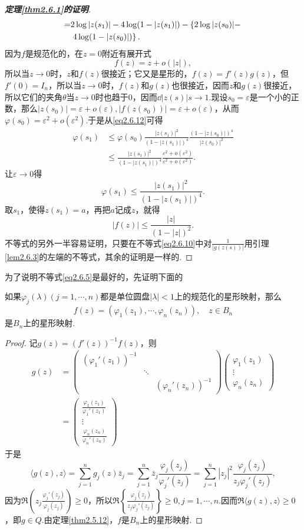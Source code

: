 \begin{proof}[\textbf{定理\ref{thm2.6.1}的证明}]
\begin{align}
	=&2\log|z(s_1)|-4\log(1-|z(s_1)|)-\left\{2\log|z(s_0)|-\right.\notag\\
	&\left.4\log(1-|z(s_0)|)\right\}.
\end{align}
因为$f$是规范化的，在$z=0$附近有展开式
\[f(z)=z+o(|z|),\]
所以当$z\to0$时，$z$和$f(z)$很接近；它又是星形的，$f(z)=f'(z)g(z)$，但$f'(0)=I_n$，所以当$z\to0$时，$f(z)$和$g(z)$也很接近，因而$z$和$g(z)$很接近，所以它们的夹角$\theta$当$z\to0$时也趋于$0$，因而$\dd{|z(s)|}{s}\to1$.现设$s_0=\varepsilon$是一个小的正数，那么$|z(s_0)|=\varepsilon+o(\varepsilon),|f(z(s_0))|=\varepsilon+o(\varepsilon)$，从而$\varphi(s_0)=\varepsilon^2+o(\varepsilon^2)$.于是从\eqref{eq2.6.12}可得
\begin{align*}
	\varphi(s_1)
	&\le\varphi(s_0)\frac{|z(s_1)|^2}{(1-|z(s_1)|)^4}\frac{(1-|z(s_0)|)^4}{|z(s_0)|^2}\\
	&\le\frac{|z(s_1)|^2}{(1-|z(s_1)|)^4}\frac{\varepsilon^2+o(\varepsilon^2)}{\varepsilon^2+o(\varepsilon^2)}.
\end{align*}
让$\varepsilon\to0$得
\[\varphi(s_1)\le\frac{|z(s_1)|^2}{(1-|z(s_1)|)^4}.\]
取$s_1$，使得$z(s_1)=a$，再把$a$记成$z$，就得
\[|f(z)|\le\frac{|z|}{(1-|z|)^2}.\]
不等式的另外一半容易证明，只要在不等式\eqref{eq2.6.10}中对$\frac1{|g(z(s))|}$用引理\ref{lem2.6.3}的左端的不等式，其余的证明是一样的.
\end{proof}
为了说明不等式\eqref{eq2.6.5}是最好的，先证明下面的
\begin{prop}\label{prop2.6.4}
	如果$\varphi_j(\lambda)(j=1,\cdots,n)$都是单位圆盘$|\lambda|<1$上的规范化的星形映射，那么
	\[f(z)=(\varphi_1(z_1),\cdots,\varphi_n(z_n)),\quad z\in B_n\]
	是$B_n$上的星形映射.
\end{prop}
\begin{proof}
	记$g(z)=(f'(z))^{-1}f(z)$，则
	\begin{align*}
		g(z)
		&=\begin{pmatrix}
			(\varphi_1'(z_1))^{-1} & & \\
			 & \ddots & \\
			 & & (\varphi_n'(z_n))^{-1}
		\end{pmatrix}\left(\begin{array}{c}
		\varphi_1(z_1)\\
		\vdots\\
		\varphi_n(z_n)
	\end{array}\right)\\
&=\left(\begin{array}{c}
	\frac{\varphi_1(z_1)}{\varphi_1'(z_1)}\\
	\vdots\\
	\frac{\varphi_n(z_n)}{\varphi_n'(z_n)}
\end{array}\right)
	\end{align*}
于是
\[\langle g(z),z\rangle=\sum_{j=1}^{n}g_j(z)\bar{z}_j=\sum_{j=1}^{n}\bar{z}_j\frac{\varphi_j(z_j)}{\varphi_j'(z_j)}=\sum_{j=1}^{n}|z_j|^2\frac{\varphi_j(z_j)}{z_j\varphi_j'(z_j)},\]
因为$\Re\left(z_j\frac{\varphi_j'(z_j)}{\varphi_j(z_j)}\right)\ge0$，所以$\Re\left\{\frac{\varphi_j(z_j)}{z_j\varphi_j'(z_j)}\right\}\ge0,j=1,\cdots,n$.因而$\Re\langle g(z),z\rangle\ge0$，即$g\in Q$.由定理\ref{thm2.5.12}，$f$是$B_n$上的星形映射.
\end{proof}
